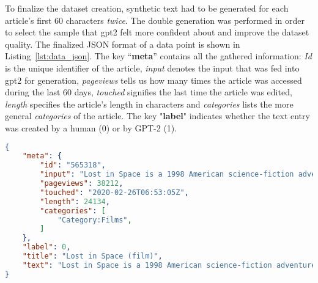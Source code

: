 To finalize the dataset creation, synthetic text had to be generated for each article's first 60 characters \textit{twice}. The double generation was performed in order to select the sample that \gls{gpt2} felt more confident about and improve the dataset quality. The finalized JSON format of a data point is shown in Listing~\ref{lst:data_json}. The key ``\textbf{meta}'' contains all the gathered information: \textit{Id} is the unique identifier of the article, \textit{input} denotes the input that was fed into \gls{gpt2} for generation, \textit{pageviews} tells us how many times the article was accessed during the last 60 days, \textit{touched} signifies the last time the article was edited, \textit{length} specifies the article's length in characters and \textit{categories} lists the more general \textit{categories} of the article. The key "\textbf{label}" indicates whether the text entry was created by a human (0) or by GPT-2 (1).

\begin{lstlisting}[language=json,firstnumber=1,label={lst:data_json},caption={Example of a data point}]
{
	"meta": {
		"id": "565318",
		"input": "Lost in Space is a 1998 American science-fiction adventure",
		"pageviews": 38212,
		"touched": "2020-02-26T06:53:05Z",
		"length": 24134,
		"categories": [
			"Category:Films",
		]
	},
	"label": 0,
	"title": "Lost in Space (film)",
	"text": "Lost in Space is a 1998 American science-fiction adventure film directed by Stephen Hopkins, and starring William Hurt, Matt LeBlanc, and Gary Oldman. The plot is adapted from the 1965-1968 CBS television series \"of the same name\". Seve"
}
\end{lstlisting}
